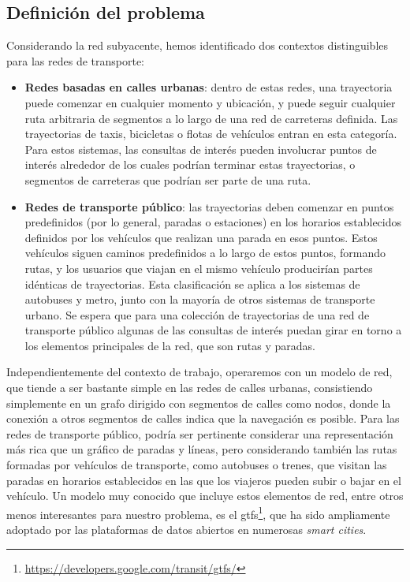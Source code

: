\subsection{Definici\'on del problema}

    Considerando la red subyacente, hemos identificado dos contextos distinguibles para las redes de transporte:
    
    \begin{itemize}
    	\item \textbf{Redes basadas en calles urbanas}: dentro de estas redes, una trayectoria puede comenzar en cualquier momento y ubicaci\'on, y puede seguir cualquier ruta arbitraria de segmentos a lo largo de una red de carreteras definida.
        Las trayectorias de taxis, bicicletas o flotas de veh\'iculos entran en esta categor\'ia. Para estos sistemas, las consultas de inter\'es pueden involucrar puntos de inter\'es alrededor de los cuales podr\'ian terminar estas trayectorias, o segmentos de carreteras que podr\'ian ser parte de una ruta.
        
    	\item \textbf{Redes de transporte p\'ublico}: las trayectorias deben comenzar en puntos predefinidos (por lo general, paradas o estaciones) en los horarios establecidos definidos por los veh\'iculos que realizan una parada en esos puntos. Estos veh\'iculos siguen caminos predefinidos a lo largo de estos puntos, formando rutas, y los usuarios que viajan en el mismo veh\'iculo producir\'ian partes id\'enticas de trayectorias.
    Esta clasificaci\'on se aplica a los sistemas de autobuses y metro, junto con la mayor\'ia de otros sistemas de transporte urbano. Se espera que para una colecci\'on de trayectorias de una red de transporte p\'ublico algunas de las consultas de inter\'es puedan girar en torno a los elementos principales de la red, que son rutas y paradas.
    \end{itemize}
    
    Independientemente del contexto de trabajo, operaremos con un modelo de red, que tiende a ser bastante simple en las redes de calles urbanas, consistiendo simplemente en un grafo dirigido con segmentos de calles como nodos, donde la conexi\'on a otros segmentos de calles indica que la navegaci\'on es posible. Para las redes de transporte p\'ublico, podr\'ia ser pertinente considerar una representaci\'on m\'as rica que un gr\'afico de paradas y l\'ineas, pero considerando tambi\'en las rutas formadas por veh\'iculos de transporte, como autobuses o trenes, que visitan las paradas en horarios establecidos en las que los viajeros pueden subir o bajar en el veh\'iculo. Un modelo muy conocido que incluye estos elementos de red, entre otros menos interesantes para nuestro problema, es el \gls{gtfs}\footnote{\url{https://developers.google.com/transit/gtfs/}}, que ha sido ampliamente adoptado por las plataformas de datos abiertos en numerosas \textit{smart cities}.
    
